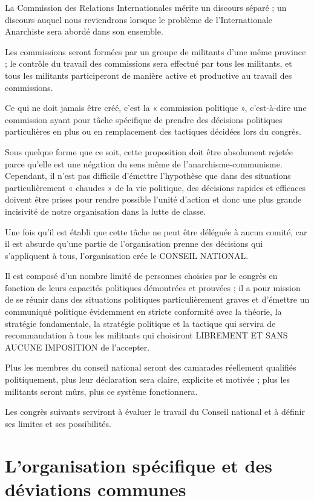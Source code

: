La Commission des Relations Internationales mérite un discours séparé ; un discours auquel nous reviendrons lorsque le problème de l'Internationale Anarchiste sera abordé dans son ensemble.

Les commissions seront formées par un groupe de militants d'une même province ; le contrôle du travail des commissions sera effectué par tous les militants, et tous les militants participeront de manière active et productive au travail des commissions.

Ce qui ne doit jamais être créé, c'est la « commission politique », c'est-à-dire une commission ayant pour tâche spécifique de prendre des décisions politiques particulières en plus ou en remplacement des tactiques décidées lors du congrès.

Sous quelque forme que ce soit, cette proposition doit être absolument rejetée parce qu'elle est une négation du sens même de l'anarchisme-communisme. Cependant, il n'est pas difficile d'émettre l'hypothèse que dans des situations particulièrement « chaudes » de la vie politique, des décisions rapides et efficaces doivent être prises pour rendre possible l'unité d'action et donc une plus grande incisivité de notre organisation dans la lutte de classe.

Une fois qu'il est établi que cette tâche ne peut être déléguée à aucun comité, car il est absurde qu'une partie de l'organisation prenne des décisions qui s'appliquent à tous, l'organisation crée le CONSEIL NATIONAL.

Il est composé d'un nombre limité de personnes choisies par le congrès en fonction de leurs capacités politiques démontrées et prouvées ; il a pour mission de se réunir dans des situations politiques particulièrement graves et d'émettre un communiqué politique évidemment en stricte conformité avec la théorie, la stratégie fondamentale, la stratégie politique et la tactique qui servira de recommandation à tous les militants qui choisiront LIBREMENT ET SANS AUCUNE IMPOSITION de l'accepter.

Plus les membres du conseil national seront des camarades réellement qualifiés politiquement, plus leur déclaration sera claire, explicite et motivée ; plus les militants seront mûrs, plus ce système fonctionnera.

Les congrès suivants serviront à évaluer le travail du Conseil national et à définir ses limites et ses possibilités.

\chapter{L'organisation spécifique et des déviations communes}\hypertarget{lorganisation-spcifique-et-des-dviations-communes}{}\label{lorganisation-spcifique-et-des-dviations-communes}

